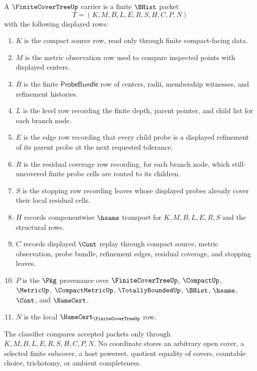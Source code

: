 \begin{definition}
\label{def:finite-cover-tree-carrier}
A $\FiniteCoverTreeUp$ carrier is a finite $\BHist$ packet
$$
T=(K,M,B,L,E,R,S,H,C,P,N)
$$
with the following displayed rows:
\begin{enumerate}
\item $K$ is the compact source row, read only through finite compact-facing data.
\item $M$ is the metric observation row used to compare inspected points with displayed centers.
\item $B$ is the finite $\mathsf{ProbeBundle}$ row of centers, radii, membership witnesses, and refinement histories.
\item $L$ is the level row recording the finite depth, parent pointer, and child list for each branch node.
\item $E$ is the edge row recording that every child probe is a displayed refinement of its parent probe at the next requested tolerance.
\item $R$ is the residual coverage row recording, for each branch node, which still-uncovered finite probe cells are routed to its children.
\item $S$ is the stopping row recording leaves whose displayed probes already cover their local residual cells.
\item $H$ records componentwise $\hsame$ transport for $K,M,B,L,E,R,S$ and the structural rows.
\item $C$ records displayed $\Cont$ replay through compact source, metric observation, probe bundle, refinement edges, residual coverage, and stopping leaves.
\item $P$ is the $\Pkg$ provenance over $\FiniteCoverTreeUp$, $\CompactUp$, $\MetricUp$, $\CompactMetricUp$, $\TotallyBoundedUp$, $\BHist$, $\hsame$, $\Cont$, and $\NameCert$.
\item $N$ is the local $\NameCert_{\FiniteCoverTreeUp}$ row.
\end{enumerate}
The classifier compares accepted packets only through $K,M,B,L,E,R,S,H,C,P,N$. No coordinate stores an arbitrary open cover, a selected finite subcover, a host powerset, quotient equality of covers, countable choice, trichotomy, or ambient completeness.
\end{definition}

